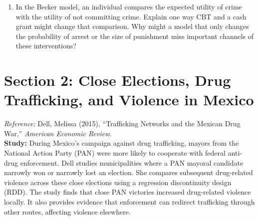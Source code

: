 \documentclass[12pt]{article}
\begin{document}
\begin{enumerate}
\item In the Becker model, an individual compares the expected utility of crime with the utility of not committing crime. Explain one way CBT and a cash grant might change that comparison. Why might a model that only changes the probability of arrest or the size of punishment miss important channels of these interventions?
\vspace{4cm}
%
%
\end{enumerate}
\clearpage

\section*{Section 2: Close Elections, Drug Trafficking, and Violence in Mexico}
\noindent \textit{Reference:} Dell, Melissa (2015), ``Trafficking Networks and the Mexican Drug War,'' \emph{American Economic Review}.
\\
\noindent \textbf{Study:} During Mexico's campaign against drug trafficking, mayors from the National Action Party (PAN) were more likely to cooperate with federal anti-drug enforcement.
Dell studies municipalities where a PAN mayoral candidate narrowly won or narrowly lost an election.
She compares subsequent drug-related violence across these close elections using a regression discontinuity design (RDD).
The study finds that close PAN victories increased drug-related violence locally.
It also provides evidence that enforcement can redirect trafficking through other routes, affecting violence elsewhere.
\end{document}
